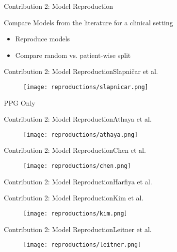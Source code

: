 \begin{frame}{Contribution 2: Model Reproduction}
    \begin{block}{Compare Models from the literature for a clinical setting}
        \begin{itemize}
            \item Reproduce models
            \item Compare random vs. patient-wise split
        \end{itemize}
    \end{block}
\end{frame}

\begin{frame}{Contribution 2: Model Reproduction}{Slapničar et al.}
    \begin{figure}
        \texttt{[image: reproductions/slapnicar.png]}
    \end{figure}
    PPG Only
\end{frame}

\begin{frame}{Contribution 2: Model Reproduction}{Athaya et al.}
    \begin{figure}
        \texttt{[image: reproductions/athaya.png]}
    \end{figure}
\end{frame}

\begin{frame}{Contribution 2: Model Reproduction}{Chen et al.}
    \begin{figure}
        \texttt{[image: reproductions/chen.png]}
    \end{figure}
\end{frame}

\begin{frame}{Contribution 2: Model Reproduction}{Harfiya et al.}
    \begin{figure}
        
    \end{figure}
\end{frame}

\begin{frame}{Contribution 2: Model Reproduction}{Kim et al.}
    \begin{figure}
        \texttt{[image: reproductions/kim.png]}
    \end{figure}
\end{frame}

\begin{frame}{Contribution 2: Model Reproduction}{Leitner et al.}
    \begin{figure}
        \texttt{[image: reproductions/leitner.png]}
    \end{figure}
\end{frame}

